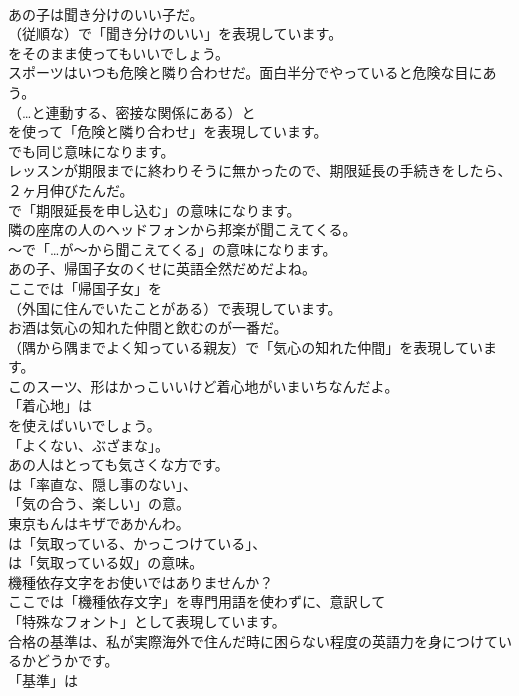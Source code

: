 \documentclass[8pt]{extreport}
\begin{document}
\begin{CJK}{UTF8}{min}
\\	あの子は聞き分けのいい子だ。 
\\	（従順な）で「聞き分けのいい」を表現しています。
\\	をそのまま使ってもいいでしょう。	
\\	スポーツはいつも危険と隣り合わせだ。面白半分でやっていると危険な目にあう。 
\\	（…と連動する、密接な関係にある）と 
\\	を使って「危険と隣り合わせ」を表現しています。
\\	でも同じ意味になります。	
\\	レッスンが期限までに終わりそうに無かったので、期限延長の手続きをしたら、２ヶ月伸びたんだ。 
\\	で「期限延長を申し込む」の意味になります。	
\\	隣の座席の人のヘッドフォンから邦楽が聞こえてくる。 
\\	～で「…が～から聞こえてくる」の意味になります。	
\\	あの子、帰国子女のくせに英語全然だめだよね。 
\\	ここでは「帰国子女」を 
\\	（外国に住んでいたことがある）で表現しています。	
\\	お酒は気心の知れた仲間と飲むのが一番だ。 
\\	（隅から隅までよく知っている親友）で「気心の知れた仲間」を表現しています。	
\\	このスーツ、形はかっこいいけど着心地がいまいちなんだよ。 
\\	「着心地」は
\\	を使えばいいでしょう。
\\	「よくない、ぶざまな」。	
\\	あの人はとっても気さくな方です。 
\\	は「率直な、隠し事のない」、
\\	「気の合う、楽しい」の意。	
\\	東京もんはキザであかんわ。 
\\	は「気取っている、かっこつけている」、
\\	は「気取っている奴」の意味。	
\\	機種依存文字をお使いではありませんか？ 
\\	ここでは「機種依存文字」を専門用語を使わずに、意訳して
\\	「特殊なフォント」として表現しています。	
\\	合格の基準は、私が実際海外で住んだ時に困らない程度の英語力を身につけているかどうかです。 
\\	「基準」は

\end{CJK}
\end{document}
